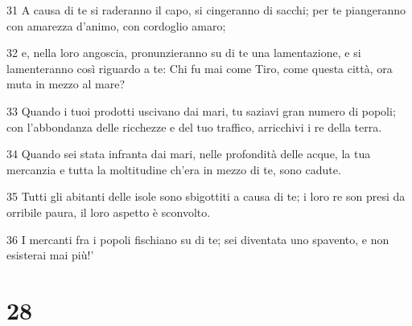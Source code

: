 \par 31 A causa di te si raderanno il capo, si cingeranno di sacchi; per te piangeranno con amarezza d'animo, con cordoglio amaro;
\par 32 e, nella loro angoscia, pronunzieranno su di te una lamentazione, e si lamenteranno così riguardo a te: Chi fu mai come Tiro, come questa città, ora muta in mezzo al mare?
\par 33 Quando i tuoi prodotti uscivano dai mari, tu saziavi gran numero di popoli; con l'abbondanza delle ricchezze e del tuo traffico, arricchivi i re della terra.
\par 34 Quando sei stata infranta dai mari, nelle profondità delle acque, la tua mercanzia e tutta la moltitudine ch'era in mezzo di te, sono cadute.
\par 35 Tutti gli abitanti delle isole sono sbigottiti a causa di te; i loro re son presi da orribile paura, il loro aspetto è sconvolto.
\par 36 I mercanti fra i popoli fischiano su di te; sei diventata uno spavento, e non esisterai mai più!'

\chapter{28}

